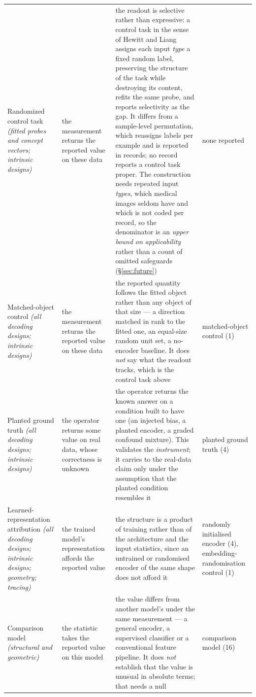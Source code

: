 \begin{table}
\begin{tabular}{@{}L{3.2cm}L{4.0cm}L{11.6cm}L{4.0cm}@{}}
Randomized control task \emph{(fitted probes and concept vectors; intrinsic designs)} & the measurement returns the reported value on these data & the readout is selective rather than expressive: a control task in the sense of Hewitt and Liang assigns each input \emph{type} a fixed random label, preserving the structure of the task while destroying its content, refits the same probe, and reports selectivity as the gap. It differs from a sample-level permutation, which reassigns labels per example and is reported in \Vperm{} records; no record reports a control task proper. The construction needs repeated input \emph{types}, which medical images seldom have and which is not coded per record, so the denominator is an \emph{upper bound on applicability} rather than a count of omitted safeguards (\S\ref{sec:future}) & none reported \\
Matched-object control \emph{(all decoding designs; intrinsic designs)} & the measurement returns the reported value on these data & the reported quantity follows the fitted object rather than any object of that size --- a direction matched in rank to the fitted one, an equal-size random unit set, a no-encoder baseline. It does \emph{not} say what the readout tracks, which is the control task above & matched-object control (1) \\
Planted ground truth \emph{(all decoding designs; intrinsic designs)} & the operator returns some value on real data, whose correctness is unknown & the operator returns the known answer on a condition built to have one (an injected bias, a planted encoder, a graded confound mixture). This validates the \emph{instrument}; it carries to the real-data claim only under the assumption that the planted condition resembles it & planted ground truth (4) \\
Learned-representation attribution \emph{(all decoding designs; intrinsic designs; geometry; tracing)} & the trained model's representation affords the reported value & the structure is a product of training rather than of the architecture and the input statistics, since an untrained or randomised encoder of the same shape does not afford it & randomly initialised encoder (4), embedding-randomisation control (1) \\
Comparison model \emph{(structural and geometric)} & the statistic takes the reported value on this model & the value differs from another model's under the same measurement --- a general encoder, a supervised classifier or a conventional feature pipeline. It does \emph{not} establish that the value is unusual in absolute terms; that needs a null & comparison model (16) \\

\end{tabular}
\end{table}
